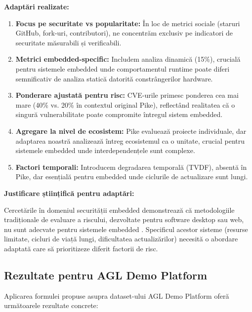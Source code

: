 \documentclass[12pt,a4paper]{article}
\begin{document}
\textbf{Adaptări realizate:}

\begin{enumerate}
\item \textbf{Focus pe securitate vs popularitate:} În loc de metrici sociale (staruri GitHub, fork-uri, contributori), ne concentrăm exclusiv pe indicatori de securitate măsurabili și verificabili.

\item \textbf{Metrici embedded-specific:} Includem analiza dinamică (15\%), crucială pentru sistemele embedded unde comportamentul runtime poate diferi semnificativ de analiza statică datorită constrângerilor hardware.

\item \textbf{Ponderare ajustată pentru risc:} CVE-urile primesc ponderea cea mai mare (40\% vs. 20\% în contextul original Pike), reflectând realitatea că o singură vulnerabilitate poate compromite întregul sistem embedded.

\item \textbf{Agregare la nivel de ecosistem:} Pike evaluează proiecte individuale, dar adaptarea noastră analizează întreg ecosistemul ca o unitate, crucial pentru sistemele embedded unde interdependențele sunt complexe.

\item \textbf{Factori temporali:} Introducem degradarea temporală (TVDF), absentă în Pike, dar esențială pentru embedded unde ciclurile de actualizare sunt lungi.
\end{enumerate}

\textbf{Justificare științifică pentru adaptări:}

Cercetările în domeniul securității embedded demonstrează că metodologiile tradiționale de evaluare a riscului, dezvoltate pentru software desktop sau web, nu sunt adecvate pentru sistemele embedded \cite{yasasin2020security,neutatz2019automated}. Specificul acestor sisteme (resurse limitate, cicluri de viață lungi, dificultatea actualizărilor) necesită o abordare adaptată care să prioritizeze diferit factorii de risc.

\subsection{Rezultate pentru AGL Demo Platform}

Aplicarea formulei propuse asupra dataset-ului AGL Demo Platform oferă următoarele rezultate concrete:
\end{document}
